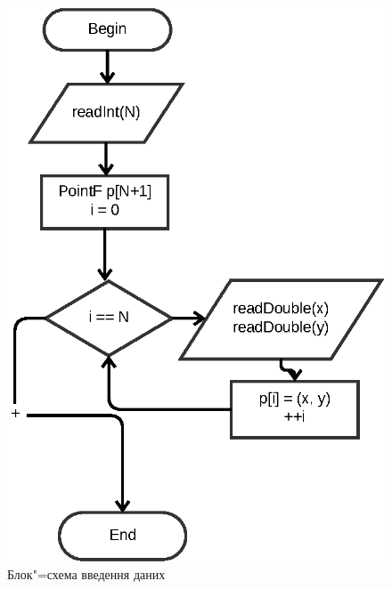 \documentclass[simple,14pt,utf8,ukrainian]{eskdtext}
\begin{document}
    \begin{figure}[h]
      \begin{center}
        \includegraphics{input.eps}
      \end{center}
      \caption{Блок"=схема введення даних}
      \label{fig:input}
    \end{figure}
\end{document}
